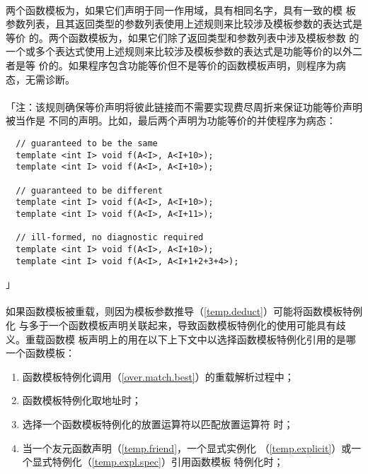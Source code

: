 \paragraph{}
两个函数模板为，如果它们声明于同一作用域，具有相同名字，具有一致的模
板参数列表，且其返回类型的参数列表使用上述规则来比较涉及模板参数的表达式是等价
的。两个函数模板为，如果它们除了返回类型和参数列表中涉及模板参数
的一个或多个表达式使用上述规则来比较涉及模板参数的表达式是功能等价的以外二者是等
价的。如果程序包含功能等价但不是等价的函数模板声明，则程序为病态，无需诊断。

\paragraph{}
「注：该规则确保等价声明将彼此链接而不需要实现费尽周折来保证功能等价声明被当作是
不同的声明。比如，最后两个声明为功能等价的并使程序为病态：
\begin{lstlisting}
  // guaranteed to be the same
  template <int I> void f(A<I>, A<I+10>);
  template <int I> void f(A<I>, A<I+10>);

  // guaranteed to be different
  template <int I> void f(A<I>, A<I+10>);
  template <int I> void f(A<I>, A<I+11>);

  // ill-formed, no diagnostic required
  template <int I> void f(A<I>, A<I+10>);
  template <int I> void f(A<I>, A<I+1+2+3+4>);
\end{lstlisting}」

\paragraph{}
如果函数模板被重载，则因为模板参数推导（\ref{temp.deduct}）可能将函数模板特例化
与多于一个函数模板声明关联起来，导致函数模板特例化的使用可能具有歧义。重载函数模
板声明上的用在以下上下文中以选择函数模板特例化引用的是哪一个函数模板：
\begin{enumerate}
  \item{函数模板特例化调用（\ref{over.match.best}）的重载解析过程中；}
  \item{函数模板特例化取地址时；}
  \item{选择一个函数模板特例化的放置运算符以匹配放置运算符
    时；}
  \item{当一个友元函数声明（\ref{temp.friend}，一个显式实例化
    （\ref{temp.explicit}）或一个显式特例化（\ref{temp.expl.spec}）引用函数模板
    特例化时；}
\end{enumerate}

